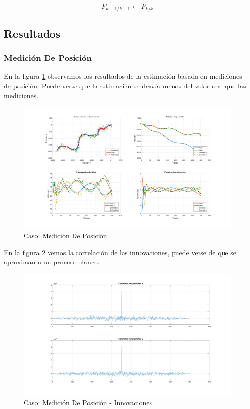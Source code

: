 				\begin{equation*}
					P_{k - 1/k - 1} \leftarrow P_{k/k}
				\end{equation*}

	\subsection{Resultados}
		\subsubsection{Medición De Posición}
			En la figura \ref{fig:ej2a} observamos los resultados de la estimación basada en mediciones de posición. Puede verse que la estimación se desvía menos del valor real que las mediciones.

		\begin{figure}[H]
			\centering
			\includegraphics[width=1.0\textwidth,keepaspectratio]{Figuras/graf_ej2a.pdf}
			\caption{Caso: Medición De Posición}
			\label{fig:ej2a}
		\end{figure}
		
		En la figura \ref{fig:ej2a_innov} vemos la correlación de las innovaciones, puede verse de que se aproximan a un proceso blanco.
		
		\begin{figure}[H]
			\centering
			\includegraphics[width=1.0\textwidth,keepaspectratio]{Figuras/covinn_ej2a.pdf}
			\caption{Caso: Medición De Posición - Innovaciones}
			\label{fig:ej2a_innov}
		\end{figure}
		
